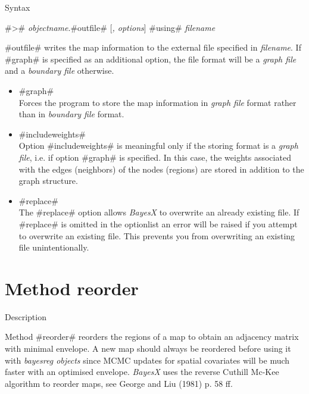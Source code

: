 \begin{stanza}{Syntax}

#># {\em objectname}.#outfile# [{\em , options}] #using# {\em
filename}

#outfile# writes the map information to the external file
specified in {\em filename}. If #graph# is specified as an
additional option, the file format will be a {\em graph file} and
a {\em boundary file} otherwise.
\end{stanza}


\begin{itemize}
\item #graph# \\
Forces the program to store the map information in {\em graph
file} format rather than in {\em boundary file} format.
\item #includeweights# \\
Option #includeweights# is meaningful only if the storing format
is a {\em graph file}, i.e. if option #graph# is specified. In
this case, the weights associated with the edges (neighbors) of
the nodes (regions) are stored in addition to the graph structure.
\item #replace# \\
The #replace# option allows {\em BayesX} to overwrite an already
existing file. If #replace# is omitted in the optionlist an error
will be raised if you attempt to overwrite an existing file. This
prevents you from overwriting an existing file unintentionally.
\end{itemize}



\clearpage



\section{Method reorder}
\label{mapreorder}  

\begin{stanza}{Description}

Method #reorder# reorders the regions of a map to obtain an
adjacency matrix with minimal envelope. A new map should always be
reordered before using it with {\em bayesreg objects} since MCMC
updates for spatial covariates will be much faster with an
optimised envelope. {\em BayesX} uses the reverse Cuthill Mc-Kee
algorithm to reorder maps, see George and Liu (1981) p. 58 ff.
\end{stanza}

